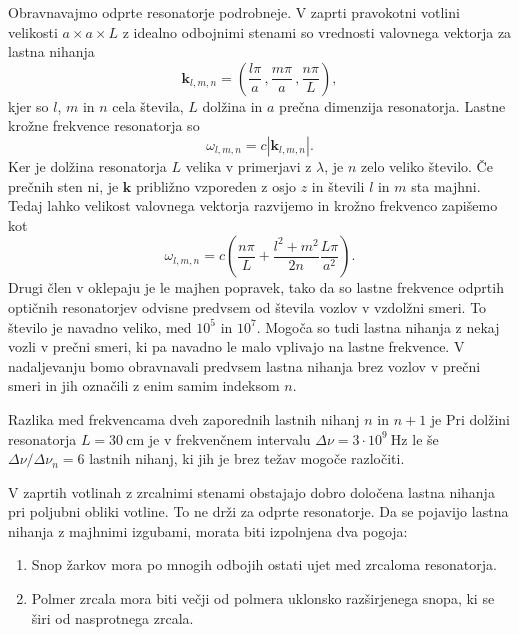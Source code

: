 Obravnavajmo odprte resonatorje podrobneje. V zaprti pravokotni votlini velikosti
$a\times a\times L$ z idealno odbojnimi stenami so vrednosti
valovnega vektorja za lastna nihanja 
\begin{equation}
\mathbf{k}_{l,m,n}=\left(\frac{l\pi}{a}\,,\frac{m\pi}{a}\,,\frac{n\pi}{L}\right),\label{eq:k-votlina}
\end{equation}
kjer so $l$, $m$ in $n$ cela števila, $L$ dolžina in $a$ prečna
dimenzija resonatorja. Lastne krožne frekvence resonatorja so 
\begin{equation}
\omega_{l,m,n}=c|\mathbf{k}_{l,m,n}|.\label{eq:omega-votlina}
\end{equation}
Ker je dolžina resonatorja $L$ velika v primerjavi z $\lambda$, je $n$
zelo veliko število. Če prečnih sten ni, je  $\mathbf{k}$ približno
vzporeden z osjo $z$ in števili $l$ in $m$ sta majhni. Tedaj
lahko velikost valovnega vektorja razvijemo in krožno frekvenco zapišemo kot
\begin{equation}
\omega_{l,m,n}=c\left(\frac{n\pi}{L}+\frac{l^{2}+m^{2}}{2n}\frac{L \pi}{a^{2}}\right).
\label{eq:delta-omega-resonator-razvoj}
\end{equation}
Drugi člen v oklepaju je le majhen popravek, tako da so
lastne frekvence odprtih optičnih resonatorjev odvisne predvsem od
števila vozlov v vzdolžni smeri. To število je navadno veliko, med $10^{5}$
in $10^{7}$. Mogoča so tudi lastna nihanja z nekaj vozli v prečni
smeri, ki pa navadno le malo vplivajo na lastne frekvence. V nadaljevanju
bomo obravnavali predvsem lastna nihanja brez vozlov v prečni smeri in
jih označili z enim samim indeksom $n$.

Razlika med frekvencama dveh zaporednih lastnih nihanj 
$n$ in $n+1$ je
Pri dolžini resonatorja $L=30~\si{\centi\metre}$ je v frekvenčnem
intervalu $\Delta \nu = 3\cdot10^{9}~\si{\hertz}$ le še $\Delta \nu /\Delta \nu_n = 6$ lastnih 
nihanj, ki jih je brez težav mogoče razločiti.

V zaprtih votlinah z zrcalnimi stenami obstajajo dobro določena lastna
nihanja pri poljubni obliki votline. To ne drži za odprte resonatorje.
Da se pojavijo lastna nihanja z majhnimi izgubami, morata
biti izpolnjena dva pogoja:

\begin{enumerate} 
\item Snop žarkov mora po mnogih odbojih ostati ujet med zrcaloma resonatorja.
\item Polmer zrcala mora biti večji od polmera uklonsko razširjenega snopa, ki se širi od nasprotnega zrcala. 
\end{enumerate}

